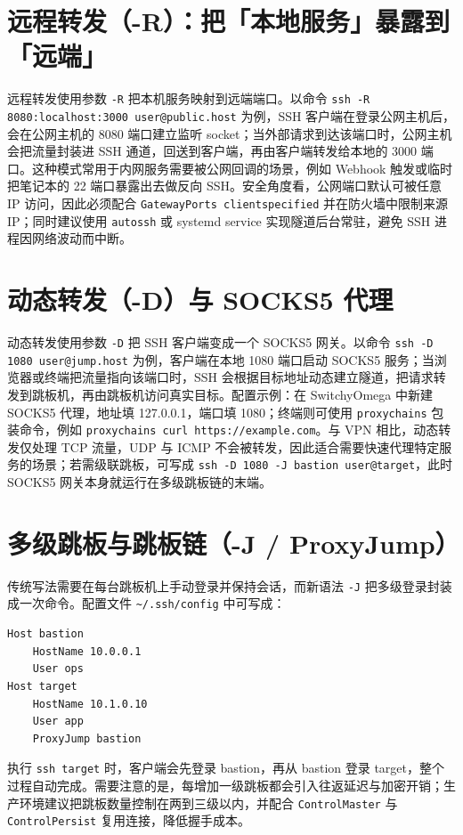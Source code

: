 \chapter{远程转发（-R）：把「本地服务」暴露到「远端」}
远程转发使用参数 \texttt{-R} 把本机服务映射到远端端口。以命令 \texttt{ssh -R 8080:localhost:3000 user@public.host} 为例，SSH 客户端在登录公网主机后，会在公网主机的 8080 端口建立监听 socket；当外部请求到达该端口时，公网主机会把流量封装进 SSH 通道，回送到客户端，再由客户端转发给本地的 3000 端口。这种模式常用于内网服务需要被公网回调的场景，例如 Webhook 触发或临时把笔记本的 22 端口暴露出去做反向 SSH。安全角度看，公网端口默认可被任意 IP 访问，因此必须配合 \texttt{GatewayPorts clientspecified} 并在防火墙中限制来源 IP；同时建议使用 \texttt{autossh} 或 systemd service 实现隧道后台常驻，避免 SSH 进程因网络波动而中断。\par
\chapter{动态转发（-D）与 SOCKS5 代理}
动态转发使用参数 \texttt{-D} 把 SSH 客户端变成一个 SOCKS5 网关。以命令 \texttt{ssh -D 1080 user@jump.host} 为例，客户端在本地 1080 端口启动 SOCKS5 服务；当浏览器或终端把流量指向该端口时，SSH 会根据目标地址动态建立隧道，把请求转发到跳板机，再由跳板机访问真实目标。配置示例：在 SwitchyOmega 中新建 SOCKS5 代理，地址填 127.0.0.1，端口填 1080；终端则可使用 \texttt{proxychains} 包装命令，例如 \texttt{proxychains curl https://example.com}。与 VPN 相比，动态转发仅处理 TCP 流量，UDP 与 ICMP 不会被转发，因此适合需要快速代理特定服务的场景；若需级联跳板，可写成 \texttt{ssh -D 1080 -J bastion user@target}，此时 SOCKS5 网关本身就运行在多级跳板链的末端。\par
\chapter{多级跳板与跳板链（-J / ProxyJump）}
传统写法需要在每台跳板机上手动登录并保持会话，而新语法 \texttt{-J} 把多级登录封装成一次命令。配置文件 \texttt{\~{}/.ssh/config} 中可写成：\par
\begin{lstlisting}[language=sshconfig]
Host bastion
    HostName 10.0.0.1
    User ops
Host target
    HostName 10.1.0.10
    User app
    ProxyJump bastion
\end{lstlisting}
执行 \texttt{ssh target} 时，客户端会先登录 bastion，再从 bastion 登录 target，整个过程自动完成。需要注意的是，每增加一级跳板都会引入往返延迟与加密开销；生产环境建议把跳板数量控制在两到三级以内，并配合 \texttt{ControlMaster} 与 \texttt{ControlPersist} 复用连接，降低握手成本。\par
